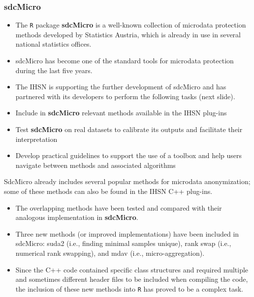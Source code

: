 \documentclass[SDCmaster.tex]{subfiles}
\begin{document}
	\begin{frame}
		\frametitle{sdcMicro}
\begin{itemize}
\item The \texttt{R} package \textbf{sdcMicro} is a well-known collection of microdata protection methods developed by Statistics Austria, which is already in use in several national statistics offices. 
\item sdcMicro has become one of the standard tools for microdata protection during the last five years.
\item The IHSN is supporting the further development of sdcMicro and has partnered with its developers to perform the following tasks (next slide).
\end{itemize}
\end{frame}

\begin{frame}
	\begin{itemize}
\item Include in \textbf{sdcMicro} relevant methods available in the IHSN plug-ins
\item Test \textbf{sdcMicro} on real datasets to calibrate its outputs and facilitate their interpretation
\item Develop practical guidelines to support the use of a toolbox and help users navigate between methods and associated algorithms

	\end{itemize}
SdcMicro already includes several popular methods for microdata anonymization; some of these methods can also be found in the IHSN C++ plug-ins.
\end{frame}

\begin{frame} 
\begin{itemize}
\item The overlapping methods have been tested and compared with their analogous implementation in \textbf{sdcMicro}. 
\item Three new methods (or improved implementations) have been included in sdcMicro: suda2 (i.e., finding minimal samples unique), rank swap (i.e., numerical rank swapping), and mdav (i.e., micro-aggregation). 
\item Since the C++ code contained specific class structures 
and required multiple and sometimes different header files to be included when compiling the code, the inclusion of these new methods into \texttt{R} has proved to be a complex task. 
\end{itemize}
\end{frame}
\end{document}
